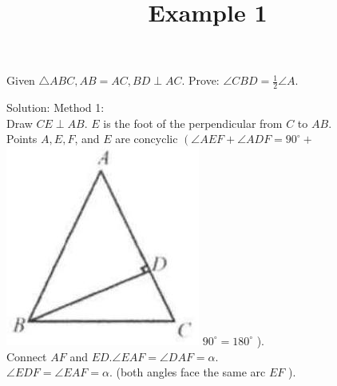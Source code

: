 \documentclass{article}
\title{Example 1}
\date{}
\begin{document}
\maketitle

Given \(\triangle A B C, A B=A C, B D \perp A C\). Prove: \(\angle C B D=\frac{1}{2} \angle A\).

Solution:
Method 1:\\
Draw \(C E \perp A B\). \(E\) is the foot of the perpendicular from \(C\) to \(A B\).\\
Points \(A, E, F\), and \(E\) are concyclic \(\left(\angle A E F+\angle A D F=90^{\circ}+\right.\)\\
\includegraphics[width=\textwidth]{images/194(2).jpg} \(90^{\circ}=180^{\circ}\) ).\\
Connect \(A F\) and \(E D . \angle E A F=\angle D A F=\alpha\).\\
\(\angle E D F=\angle E A F=\alpha\). (both angles face the same arc \(E F\) ).
\end{document}
